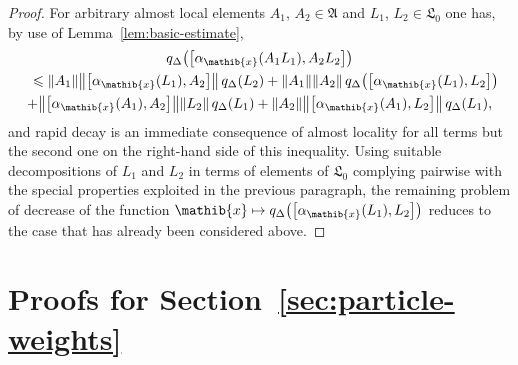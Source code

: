 \documentclass[a4paper,a4paper]{article}
\numberwithin{equation}{section}
\newcommand{\Afrak}{\mathfrak{A}}
\newcommand{\Lfrak}{\mathfrak{L}}
\newcommand{\xib}{\mathib{x}}
\newcommand{\aibx}{\alpha_\mathib{x}}
\theoremstyle{definition}
\theoremstyle{plain}
\theoremstyle{remark}
\newcommand{\bcomm}[2]{\bigl[ #1 , #2 \bigr]}
\newcommand{\norm}[1]{\lVert #1 \rVert}
\newcommand{\bnorm}[1]{\bigl\lVert #1 \bigr\rVert}
\newcommand{\qDx}[1]{q_\Delta ( #1 )}
\newcommand{\bqDx}[1]{q_\Delta \bigl( #1 \bigr)}
\begin{document}
\begin{proof}
    For arbitrary almost local elements $A_1$, $ A_2 \in \Afrak$ and
    $L_1$, $L_2 \in \Lfrak_0$ one has, by use of
    Lemma~\ref{lem:basic-estimate},
    \begin{multline*}
      \bqDx{\bcomm{\aibx ( A_1 L_1 )}{A_2 L_2}} \\
      \shoveleft{\leqslant \norm{A_1} \bnorm{\bcomm{\aibx ( L_1
      )}{A_2}} \, \qDx{L_2} + \norm{A_1} \norm{A_2} \,
      \bqDx{\bcomm{\aibx ( L_1 )}{L_2}}} \\
      + \bnorm{\bcomm{\aibx ( A_1 )}{A_2}} \norm{L_2} \, \qDx{L_1} +
      \norm{A_2} \bnorm{\bcomm{\aibx ( A_1 )}{L_2}} \, \qDx{L_1}
      \text{,}
    \end{multline*}
    and rapid decay is an immediate consequence of almost locality for
    all terms but the second one on the right-hand side of this
    inequality. Using suitable decompositions of $L_1$ and $L_2$ in
    terms of elements of $\Lfrak_0$ complying pairwise with the
    special properties exploited in the previous paragraph, the
    remaining problem of decrease of the function $\xib \mapsto
    \bqDx{\bcomm{\aibx ( L_1 )}{L_2}}$ reduces to the case that has
    already been considered above.
  \end{proof}


\section{Proofs for Section~\ref{sec:particle-weights}}
  \label{sec:weights-proofs}
  
\end{document}
